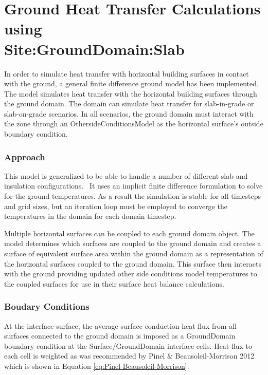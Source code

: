\section{Ground Heat Transfer Calculations using \\
		Site:GroundDomain:Slab}\label{ground-heat-transfer-calculations-using-sitegrounddomainslab}

In order to simulate heat transfer with horizontal building surfaces in contact with the ground, a general finite difference ground model has been implemented. The model simulates heat transfer with the horizontal building surfaces through the ground domain. The domain can simulate heat transfer for slab-in-grade or slab-on-grade scenarios. In all scenarios, the ground domain must interact with the zone through an OthersideConditionsModel as the horizontal surface's outside boundary condition.

\subsubsection{Approach}\label{approach-001}

This model is generalized to be able to handle a number of different slab and insulation configurations.~ It uses an implicit finite difference formulation to solve for the ground temperatures. As a result the simulation is stable for all timesteps and grid sizes, but an iteration loop must be employed to converge the temperatures in the domain for each domain timestep.

Multiple horizontal surfaces can be coupled to each ground domain object. The model determines which surfaces are coupled to the ground domain and creates a surface of equivalent surface area within the ground domain as a representation of the horizontal surfaces coupled to the ground domain. This surface then interacts with the ground providing updated other side conditions model temperatures to the coupled surfaces for use in their surface heat balance calculations.

\subsubsection{Boudary Conditions}\label{boudary-conditions}

At the interface surface, the average surface conduction heat flux from all surfaces connected to the ground domain is imposed as a GroundDomain boundary condition at the Surface/GroundDomain interface cells. Heat flux to each cell is weighted as was recommended by Pinel \& Beausoleil-Morrison 2012 which is shown in Equation \ref{eq:Pinel-Beausoleil-Morrison}.

